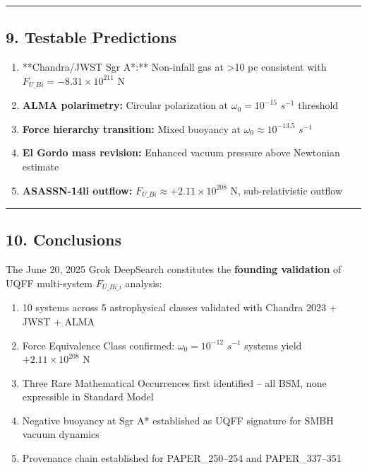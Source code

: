 \documentclass[
  11pt,
]{article}
\newcounter{none} %
\providecommand{\tightlist}{%
  \setlength{\itemsep}{0pt}\setlength{\parskip}{0pt}}
\begin{document}
\begin{center}\rule{0.5\linewidth}{0.5pt}\end{center}

\subsection{9. Testable Predictions}\label{testable-predictions}

\begin{enumerate}
\def\labelenumi{\arabic{enumi}.}
\tightlist
\item
  **Chandra/JWST Sgr A*:** Non-infall gas at \textgreater10 pc
  consistent with \(F_{U\_Bi} = -8.31 \times 10^{211}\) N
\item
  \textbf{ALMA polarimetry:} Circular polarization at
  \(\omega_0 = 10^{-15}\) \(s^{-1}\) threshold
\item
  \textbf{Force hierarchy transition:} Mixed buoyancy at
  \(\omega_0 \approx 10^{-13.5}\) \(s^{-1}\)
\item
  \textbf{El Gordo mass revision:} Enhanced vacuum pressure above
  Newtonian estimate
\item
  \textbf{ASASSN-14li outflow:}
  \(F_{U\_Bi} \approx +2.11 \times 10^{208}\) N, sub-relativistic
  outflow
\end{enumerate}

\begin{center}\rule{0.5\linewidth}{0.5pt}\end{center}

\subsection{10. Conclusions}\label{conclusions}

The June 20, 2025 Grok DeepSearch constitutes the \textbf{founding
validation} of UQFF multi-system \(F_{U\_Bi\_i}\) analysis:

\begin{enumerate}
\def\labelenumi{\arabic{enumi}.}
\tightlist
\item
  10 systems across 5 astrophysical classes validated with Chandra 2023
  + JWST + ALMA
\item
  Force Equivalence Class confirmed: \(\omega_0 = 10^{-12}\) \(s^{-1}\)
  systems yield \(+2.11 \times 10^{208}\) N
\item
  Three Rare Mathematical Occurrences first identified -- all BSM, none
  expressible in Standard Model
\item
  Negative buoyancy at Sgr A* established as UQFF signature for SMBH
  vacuum dynamics
\item
  Provenance chain established for PAPER\_250--254 and PAPER\_337--351
\end{enumerate}
\end{document}
